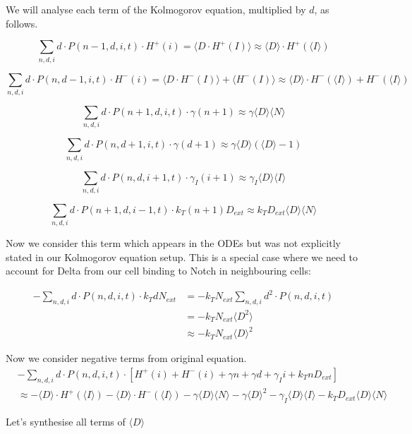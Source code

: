 \documentclass{article}
\begin{document}
\begin{flushleft}
We will analyse each term of the Kolmogorov equation, multiplied by $d$, as follows.

\[
\sum_{n,d,i} d \cdot P(n-1,d,i,t) \cdot H^+(i) = \langle D \cdot H^+(I) \rangle \approx \langle D \rangle \cdot H^+(\langle I \rangle)
\]

\[
\sum_{n,d,i} d \cdot P(n,d-1,i,t) \cdot H^-(i) = \langle D \cdot H^-(I) \rangle + \langle H^-(I) \rangle 
\approx \langle D \rangle \cdot H^-(\langle I \rangle) + H^-(\langle I \rangle)
\]

\[
\sum_{n,d,i} d \cdot P(n+1,d,i,t) \cdot \gamma(n+1) \approx \gamma \langle D \rangle \langle N \rangle
\]

\[
\sum_{n,d,i} d \cdot P(n,d+1,i,t) \cdot \gamma(d+1) \approx \gamma \langle D \rangle (\langle D \rangle - 1)
\]

\[
\sum_{n,d,i} d \cdot P(n,d,i+1,t) \cdot \gamma_I(i+1) \approx \gamma_I \langle D \rangle \langle I \rangle
\]

\[
\sum_{n,d,i} d \cdot P(n+1,d,i-1,t) \cdot k_T(n+1)D_{ext} \approx k_T D_{ext} \langle D \rangle \langle N \rangle
\]

Now we consider this term which appears in the ODEs but was not explicitly stated in our Kolmogorov equation setup. This is a special case where we need to account for Delta from our cell binding to Notch in neighbouring cells:

\begin{align*}
-\sum_{n,d,i} d \cdot P(n,d,i,t) \cdot k_T d N_{ext} &= -k_T N_{ext} \sum_{n,d,i} d^2 \cdot P(n,d,i,t) \\
&= -k_T N_{ext} \langle D^2 \rangle \\
&\approx -k_T N_{ext} \langle D \rangle^2
\end{align*}

Now we consider negative terms from original equation.
\begin{align*}
&-\sum_{n,d,i} d \cdot P(n,d,i,t) \cdot [H^+(i) + H^-(i) + \gamma n + \gamma d + \gamma_I i + k_T n D_{ext}] \\
&\approx -\langle D \rangle \cdot H^+(\langle I \rangle) - \langle D \rangle \cdot H^-(\langle I \rangle) - \gamma \langle D \rangle \langle N \rangle - \gamma \langle D \rangle^2 - \gamma_I \langle D \rangle \langle I \rangle - k_T D_{ext} \langle D \rangle \langle N \rangle
\end{align*}

Let's synthesise all terms of $\langle D \rangle$


\end{flushleft}
\end{document}
